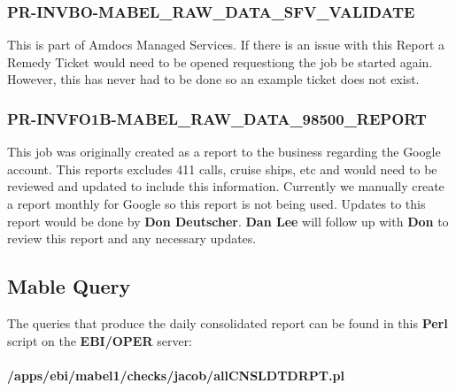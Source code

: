 \documentclass[12pt,twoside]{article}
\begin{document}
\subsubsection{PR-INVBO-MABEL\_RAW\_DATA\_SFV\_VALIDATE}
\label{sec:orgheadline53}
This is part of Amdocs Managed Services. If there is an issue with this Report a Remedy Ticket would need to be opened requestiong the job be started again. 
However, this has never had to be done so an example ticket does not exist. 

\subsubsection{PR-INVFO1B-MABEL\_RAW\_DATA\_98500\_REPORT}
\label{sec:orgheadline54}
This job was originally created as a report to the business regarding the Google account. This reports excludes 411 calls, cruise ships, etc and would need to be reviewed 
and updated to include this information. Currently we manually create a report monthly for Google so this report is not being used. 
Updates to this report would be done by \textbf{Don Deutscher}.
\textbf{Dan Lee} will follow up with \textbf{Don} to review this report and any necessary updates.

\normalsize
\newpage
\subsection{Mable Query}
\label{sec:orgheadline57}
The queries that produce the daily consolidated report can be found in this \textbf{Perl} script on the
\textbf{EBI/OPER} server:\\
\\
\textbf{/apps/ebi/mabel1/checks/jacob/allCNSLDTDRPT.pl}
\end{document}

